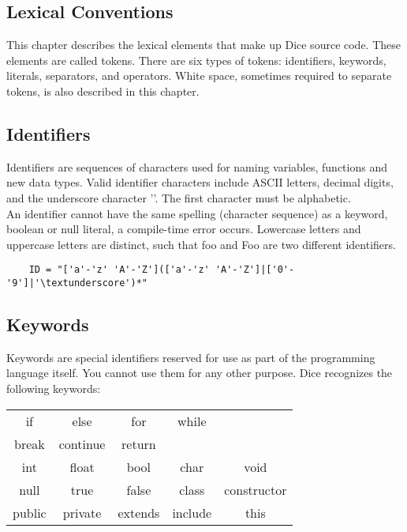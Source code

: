 \begin{homeworkProblem}
	\section{Lexical Conventions}
	This chapter describes the lexical elements that make up Dice source code. These elements are called tokens. There are six types of tokens: identifiers, keywords, literals, separators, and operators. White space, sometimes required to separate tokens, is also described in this chapter.
	
	\subsection{Identifiers}
	Identifiers are sequences of characters used for naming variables, functions and new data types. Valid identifier characters include ASCII letters, decimal digits, and the underscore character '\textunderscore'. The first character must be alphabetic.\\
	An identifier cannot have the same spelling (character sequence) as a keyword, boolean or null literal, a compile-time error occurs. Lowercase letters and uppercase letters are distinct, such that foo and Foo are two different identifiers.
	
	\begin{verbatim}
	ID = "['a'-'z' 'A'-'Z'](['a'-'z' 'A'-'Z']|['0'-'9']|'\textunderscore')*"
	\end{verbatim}
	
	\subsection{Keywords}
	Keywords are special identifiers reserved for use as part of the programming language itself. You cannot use them for any other purpose. Dice recognizes the following keywords:
	
	\begin{center}
		\begin{tabular}{ccccc}
		if & else & for & while \\ 
        break & continue & return \\
		int & float & bool & char & void \\
		null & true & false & class & constructor \\
		public & private & extends & include & this \\
		\end{tabular}
	\end{center}


\end{homeworkProblem}
